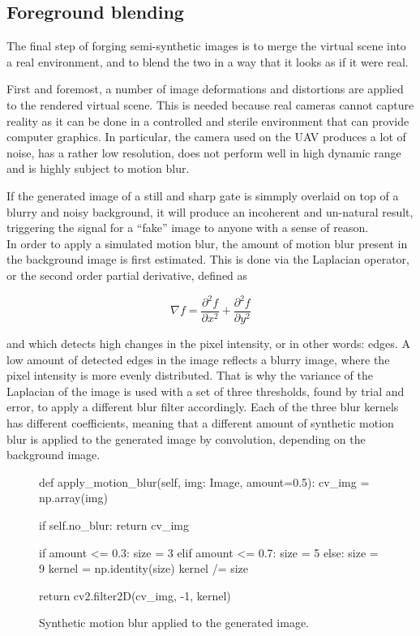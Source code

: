 \subsection{Foreground blending}

The final step of forging semi-synthetic images is to merge the virtual scene
into a real environment, and to blend the two in a way that it looks as if it
were real.

First and foremost, a number of image deformations and distortions are applied
to the rendered virtual scene. This is needed because real cameras cannot
capture reality as it can be done in a controlled and sterile environment that
can provide computer graphics. In particular, the camera used on the UAV
produces a lot of noise, has a rather low resolution, does not perform well in
high dynamic range and is highly subject to motion blur.

If the generated image of a still and sharp gate is simmply overlaid on top of
a blurry and noisy background, it will produce an incoherent and un-natural
result, triggering the signal for a ``fake'' image to anyone with a sense of
reason.\\

In order to apply a simulated motion blur, the amount of motion blur present in
the background image is first estimated. This is done via the Laplacian
operator, or the second order partial derivative, defined as

\begin{equation} \label{equ:laplacianoperator}
    \nabla f = \frac{\partial^2 f}{\partial x^2}
        + \frac{\partial^2 f}{\partial y^2}
\end{equation}

and which detects high changes in the pixel intensity, or in other words:
edges. A low amount of detected edges in the image reflects a blurry image,
where the pixel intensity is more evenly distributed. That is why the variance
of the Laplacian of the image is used with a set of three thresholds, found by
trial and error, to apply a different blur filter accordingly. Each of the
three blur kernels has different coefficients, meaning that a different amount
of synthetic motion blur is applied to the generated image by convolution,
depending on the background image.\\
\begin{figure}[h!]
    \centering
    \caption{Synthetic motion blur applied to the generated image.}
    \begin{python}
        def apply_motion_blur(self, img: Image, amount=0.5):
            cv_img = np.array(img)

            if self.no_blur:
                return cv_img

            if amount <= 0.3:
                size = 3
            elif amount <= 0.7:
                size = 5
            else:
                size = 9
            kernel = np.identity(size)
            kernel /= size

            return cv2.filter2D(cv_img, -1, kernel)
    \end{python}
\end{figure}

